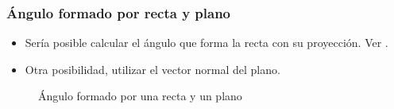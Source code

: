 \subsubsection{Ángulo formado por recta y plano}

\begin{itemize}
  \item Sería posible calcular el ángulo que forma la recta con su proyección. Ver .
  \item Otra posibilidad, utilizar el vector normal del plano.
\end{itemize}


\begin{figure}[hbtp]
\centering
{}

\label{fig::ang-recta-plano}
\caption{Ángulo formado por una recta y un plano}
\end{figure}

